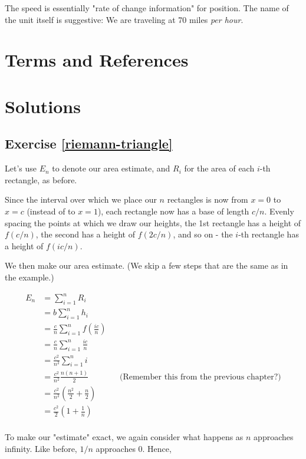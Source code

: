 \documentclass{article}
\begin{document}
The speed is essentially "rate of change information" for position. The name of the unit itself is suggestive: We are traveling at 70 miles \emph{per hour}.






\section{Terms and References}

\section{Solutions}

\subsection{Exercise \ref{riemann-triangle}}

Let's use $E_n$ to denote our area estimate, and $R_i$ for the area of each $i$-th rectangle, as before. 

Since the interval over which we place our $n$ rectangles is now from $x = 0$ to $x = c$ (instead of to $x = 1$), each rectangle now has a base of length $c/n$. Evenly spacing the points at which we draw our heights, the 1st rectangle has a height of $f(c/n)$, the second has a height of $f(2c/n)$, and so on - the $i$-th rectangle has a height of $f(ic/n)$. 

We then make our area estimate. (We skip a few steps that are the same as in the example.)

\begin{align*}
E_n &= \sum_{i=1}^n R_i \\
&= b \sum_{i=1}^n h_i \\
&= \frac{c}{n} \sum_{i=1}^n f(\frac{ic}{n}) \\
&= \frac{c}{n} \sum_{i=1}^n \frac{ic}{n} \\
&= \frac{c^2}{n^2} \sum_{i=1}^n i \\
&= \frac{c^2}{n^2} \frac{n(n+1)}{2} && \text{(Remember this from the previous chapter?)} \\
&= \frac{c^2}{n^2} \left( \frac{n^2}{2} + \frac{n}{2} \right) \\
&= \frac{c^2}{2} \left( 1 + \frac{1}{n} \right) \\
\end{align*}

To make our "estimate" exact, we again consider what happens as $n$ approaches infinity. Like before, $1/n$ approaches 0. Hence,
\end{document}
